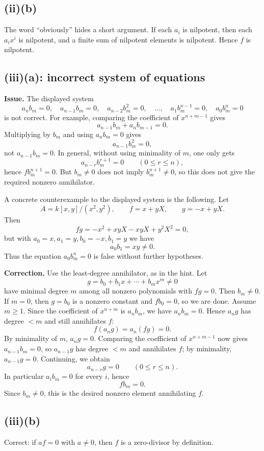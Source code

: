 \documentclass[11pt]{article}
\begin{document}
\subsection*{(ii)(b)}
The word ``obviously'' hides a short argument.  If each \(a_i\) is nilpotent,
then each \(a_ix^i\) is nilpotent, and a finite sum of nilpotent elements is
nilpotent.  Hence \(f\) is nilpotent.

\subsection*{(iii)(a): incorrect system of equations}

\textbf{Issue.}  The displayed system
\[
a_nb_m=0,\quad a_{n-1}b_m=0,\quad a_{n-2}b_m^2=0,\quad\ldots,\quad
a_1b_m^{n-1}=0,\quad a_0b_m^n=0
\]
is not correct.  For example, comparing the coefficient of \(x^{n+m-1}\) gives
\[
a_{n-1}b_m+a_nb_{m-1}=0.
\]
Multiplying by \(b_m\) and using \(a_nb_m=0\) gives
\[
a_{n-1}b_m^2=0,
\]
not \(a_{n-1}b_m=0\).  In general, without using minimality of \(m\), one only
gets
\[
a_{n-r}b_m^{r+1}=0\qquad(0\le r\le n),
\]
hence \(fb_m^{n+1}=0\).  But \(b_m\neq0\) does not imply \(b_m^{n+1}\neq0\), so
this does not give the required nonzero annihilator.

A concrete counterexample to the displayed system is the following.  Let
\[
A=k[x,y]/(x^2,y^2),\qquad f=x+yX,\qquad g=-x+yX.
\]
Then
\[
fg=-x^2+xyX-xyX+y^2X^2=0,
\]
but with \(a_0=x,a_1=y,b_0=-x,b_1=y\) we have
\[
a_0b_1=xy\neq0.
\]
Thus the equation \(a_0b_m^n=0\) is false without further hypotheses.

\textbf{Correction.}  Use the least-degree annihilator, as in the hint.  Let
\[
g=b_0+b_1x+\cdots+b_mx^m\neq0
\]
have minimal degree \(m\) among all nonzero polynomials with \(fg=0\).  Then
\(b_m\neq0\).  If \(m=0\), then \(g=b_0\) is a nonzero constant and
\(fb_0=0\), so we are done.  Assume \(m\ge1\).  Since the coefficient of
\(x^{n+m}\) is \(a_nb_m\), we have
\(a_nb_m=0\).  Hence \(a_ng\) has degree \(<m\) and still annihilates \(f\):
\[
f(a_ng)=a_n(fg)=0.
\]
By minimality of \(m\), \(a_ng=0\).  Comparing the coefficient of
\(x^{n+m-1}\) now gives \(a_{n-1}b_m=0\), so \(a_{n-1}g\) has degree \(<m\)
and annihilates \(f\); by minimality, \(a_{n-1}g=0\).  Continuing, we obtain
\[
a_{n-r}g=0\qquad(0\le r\le n).
\]
In particular \(a_ib_m=0\) for every \(i\), hence
\[
fb_m=0.
\]
Since \(b_m\neq0\), this is the desired nonzero element annihilating \(f\).

\subsection*{(iii)(b)}
Correct: if \(af=0\) with \(a\neq0\), then \(f\) is a zero-divisor by
definition.
\end{document}
